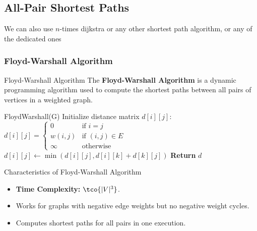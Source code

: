 \newpage
\subsection{All-Pair Shortest Paths}
We can also use $n$-times dijkstra or any other shortest path algorithm, or any of the dedicated ones

\subsubsection{Floyd-Warshall Algorithm}
\begin{definition}[]{Floyd-Warshall Algorithm}
    The \textbf{Floyd-Warshall Algorithm} is a dynamic programming algorithm used to compute the shortest paths between all pairs of vertices in a weighted graph.
\end{definition}


\begin{algo}{FloydWarshall(G)}
        \State Initialize distance matrix $d[i][j]$: $d[i][j] =
            \begin{cases}
                0       & \text{if } i = j        \\
                w(i, j) & \text{if } (i, j) \in E \\
                \infty  & \text{otherwise}
            \end{cases}$
                \State $d[i][j] \gets \min(d[i][j], d[i][k] + d[k][j])$
            \EndFor
        \EndFor
        \State \textbf{Return} $d$
    \EndProcedure
\end{algo}

\begin{properties}[]{Characteristics of Floyd-Warshall Algorithm}
    \begin{itemize}
        \item \textbf{Time Complexity:} $\tco{|V|^3}$.
        \item Works for graphs with negative edge weights but no negative weight cycles.
        \item Computes shortest paths for all pairs in one execution.
    \end{itemize}
\end{properties}

